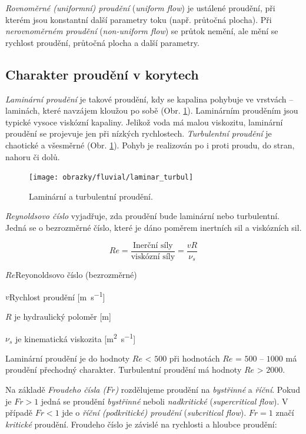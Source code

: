 \emph{Rovnoměrné (uniformní) proudění} (\textit{uniform flow}) je ustálené proudění, při kterém jsou konstantní další parametry toku (např. průtočná plocha). Při \emph{nerovnoměrném proudění} (\textit{non-uniform flow}) se průtok nemění, ale mění se rychlost proudění, průtočná plocha a další parametry. 

\subsection{Charakter proudění v korytech}
\emph{Laminární proudění} je takové proudění, kdy se kapalina pohybuje ve vrstvách -- laminách, které navzájem kloužou po sobě (Obr. \ref{fig:laminarturbul}). Laminárním prouděním jsou typické vysoce viskózní kapaliny. Jelikož voda má malou viskozitu, laminární proudění se projevuje jen při nízkých rychlostech.
\emph{Turbulentní proudění} je chaotické a všesměrné (Obr. \ref{fig:laminarturbul}). Pohyb je realizován po i proti proudu, do stran, nahoru či dolů. 

\begin{figure}[h]
	\centering
	\texttt{[image: obrazky/fluvial/laminar\_turbul]}
	\caption{Laminární a turbulentní proudění.}
	\label{fig:laminarturbul}
\end{figure}


\emph{Reynoldsovo číslo} vyjadřuje, zda proudění bude laminární nebo turbulentní. Jedná se o bezrozměrné číslo, které je dáno poměrem inertních sil a viskózních sil.

\begin{equation}\label{key}
	Re = \frac{\text{Inerční síly}}{\text{viskózní síly}} = \frac{vR}{\nu_{s}}
\end{equation}

\begin{eqexpl}
	\item{$Re$}Reyonoldsovo číslo (bezrozměrné)
	\item{$v$}Rychlost proudění [\si{\metre\per\second}]
	\item{$R$} je hydraulický poloměr [\si{\metre}]
	\item{$\nu_{s}$} je kinematická viskozita [\si{\metre\squared\per\second}]
\end{eqexpl}

Laminární proudění je do hodnoty $Re$ < $500$ při hodnotách $Re$ = $500$ -- $1000$ má proudění přechodný charakter. Turbulentní proudění má hodnoty $Re$ > $2000$.

Na základě \emph{Froudeho čísla ($Fr$)} rozdělujeme proudění na \emph{bystřinné} a \emph{říční}. Pokud je $Fr >1$ jedná se proudění \emph{bystřinné} neboli \emph{nadkritické} (\textit{supercritical flow}). V případě $Fr <1$ jde o \emph{říční (podkritické) proudění} (\textit{subcritical flow}). $Fr = 1$ značí \emph{kritické} proudění. Froudeho číslo je závislé na rychlosti a hloubce proudění:

